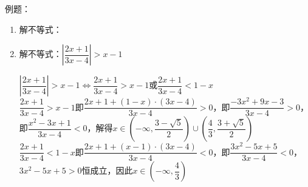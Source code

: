 例题：
\begin{enumerate}
    \item 解不等式：
    \begin{jieda}
        \begin{dingautolist}{172}
            \item $x \in (-1, 3)$
            \item $x \in \left[-\dfrac{1}{3}, 1\right]$
            \item $x \in (-\infty, -2] \cup [1, +\infty)$
            \item $x \in \left(-\infty, \dfrac{1}{3}\right) \cup \left(1, +\infty\right)$
            \item $x \in \left(\dfrac{1}{5}, +\infty\right)$
            \item $x \in \left(-\infty, -1\right) \cup \left(\dfrac{1}{5}, +\infty\right)$
            \item $x \in (2, 6)$
            \item $x \in (-\infty, -3] \cup [2, +\infty)$
        \end{dingautolist}
    \end{jieda}
    \item 解不等式：$\left|\dfrac{2x+1}{3x-4}\right| > x-1$
    \begin{jieda}
        $\left|\dfrac{2x+1}{3x-4}\right| > x-1 \Longleftrightarrow \dfrac{2x+1}{3x-4} > x-1$或$\dfrac{2x+1}{3x-4} < 1-x$ \\
        $\dfrac{2x+1}{3x-4} > x-1$即$\dfrac{2x+1 + (1-x) \cdot (3x-4)}{3x-4} > 0$，即$\dfrac{-3x^2+9x-3}{3x-4} > 0$，即$\dfrac{x^2-3x+1}{3x-4} < 0$，解得$x \in \left(-\infty, \dfrac{3-\sqrt{5}}{2}\right) \cup \left(\dfrac{4}{3}, \dfrac{3+\sqrt{5}}{2}\right)$ \\
        $\dfrac{2x+1}{3x-4} < 1-x$即$\dfrac{2x+1 + (x-1) \cdot (3x-4)}{3x-4} < 0$，即$\dfrac{3x^2-5x+5}{3x-4} < 0$，$3x^2-5x+5 > 0$恒成立，因此$x \in \left(-\infty, \dfrac{4}{3}\right)$ \\

\end{jieda}
\end{enumerate}
